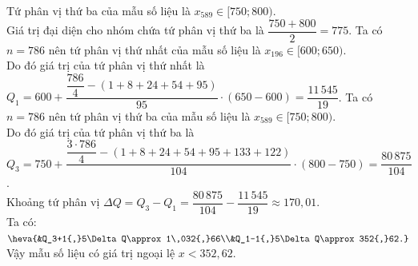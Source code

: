 \begin{ex}
{\begin{itemchoice}
\itemch Tứ phân vị thứ ba của mẫu số liệu là $x_{589}\in [750;800)$.\\
Giá trị đại diện cho nhóm chứa tứ phân vị thứ ba là $\dfrac{750+800}{2}=775$.
\itemch Ta có $n=786$ nên tứ phân vị thứ nhất của mẫu số liệu là $x_{196}\in [600;650)$.\\
Do đó giá trị của tứ phân vị thứ nhất là\\ $Q_1=600+\dfrac{\dfrac{786}{4}-(1+8+24+54+95)}{95}\cdot (650-600)=\dfrac{11\,545}{19}$.
\itemch Ta có $n=786$ nên tứ phân vị thứ ba của mẫu số liệu là $x_{589}\in [750;800)$.\\
Do đó giá trị của tứ phân vị thứ ba là\\ $Q_3=750+\dfrac{\dfrac{3\cdot786}{4}-(1+8+24+54+95+133+122)}{104}\cdot (800-750)=\dfrac{80\,875}{104}$.\\
Khoảng tứ phân vị $\Delta Q=Q_3-Q_1=\dfrac{80\,875}{104}-\dfrac{11\,545}{19}\approx 170{,}01$.\\
Ta có: $\heva{&Q_3+1{,}5\Delta Q\approx 1\,032{,}66\\&Q_1-1{,}5\Delta Q\approx 352{,}62.}$\\
Vậy mẫu số liệu có giá trị ngoại lệ $x<352{,}62$.
\end{itemchoice}
}
\end{ex}


